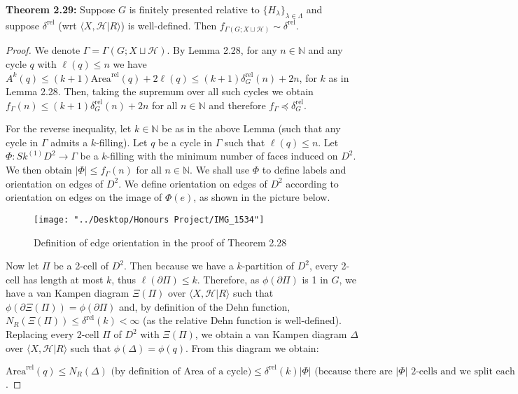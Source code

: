 \documentclass[12pt]{article}
\newcommand{\vs}{\vskip10pt}
\begin{document}
	\textbf{Theorem 2.29: } Suppose $G$ is finitely presented relative to $\{H_{\lambda}\}_{\lambda \in \Lambda}$ and suppose $\delta^{\text{rel}}$ (wrt $\langle X, \mathcal{H} \vert R \rangle$) is well-defined. Then $f_{\Gamma(G; X \sqcup \mathcal{H})} \sim \delta^{\text{rel}}$. 
	
	\begin{proof}
		
		We denote $\Gamma = \Gamma(G; X \sqcup \mathcal{H})$. By Lemma 2.28, for any $n \in \mathbb{N}$ and any cycle $q$ with $\ell(q) \leq n$ we have $A^{k}(q) \leq (k+1) \text{Area}^{\text{rel}}(q) + 2 \ell(q) \leq (k+1) \delta_G^{\text{rel}}(n) + 2n$, for $k$ as in Lemma 2.28. Then, taking the supremum over all such cycles we obtain $f_{\Gamma} (n) \leq (k+1) \delta_G^{\text{rel}}(n) + 2n$ for all $n \in \mathbb{N}$ and therefore $f_{\Gamma} \preccurlyeq \delta_G^{\text{rel}}$. 
		
		\vs 
		
		For the reverse inequality, let $k \in \mathbb{N}$ be as in the above Lemma (such that any cycle in $\Gamma$ admits a $k$-filling). Let $q$ be a cycle in $\Gamma$ such that $\ell(q) \leq n$. Let $\Phi: Sk^{(1)} D^2 \rightarrow \Gamma$ be a $k$-filling with the minimum number of faces induced on $D^2$. We then obtain $\vert \Phi \vert \leq f_{\Gamma}(n)$ for all $n \in \mathbb{N}$. We shall use $\Phi$ to define labels and orientation on edges of $D^2$. We define orientation on edges of $D^2$ according to orientation on edges on the image of $\Phi(e)$, as shown in the picture below. 
		
		\begin{figure} [H]
			\centering
			\texttt{[image: "../Desktop/Honours Project/IMG\_1534"]}
			\caption{Definition of edge orientation in the proof of Theorem 2.28}
			\label{fig:img1534}
		\end{figure}
		
		\vs 
		
		Now let $\Pi$ be a 2-cell of $D^2$. Then because we have a $k$-partition of $D^2$, every 2-cell has length at most $k$, thus $\ell(\partial \Pi) \leq k$. Therefore, as $\phi(\partial \Pi)$ is 1 in $G$, we have a van Kampen diagram $\Xi(\Pi)$ over $\langle X, \mathcal{H} \vert R \rangle$ such that $\phi(\partial \Xi(\Pi)) = \phi(\partial \Pi)$ and, by definition of the Dehn function, $N_{R} (\Xi(\Pi)) \leq \delta^{\text{rel}}(k) < \infty$ (as the relative Dehn function is well-defined). Replacing every 2-cell $\Pi$ of $D^2$ with $\Xi(\Pi)$, we obtain a van Kampen diagram $\Delta$ over $\langle X, \mathcal{H} \vert R \rangle$ such that $\phi(\Delta) = \phi(q)$. From this diagram we obtain: 
		
		\vs 
		
		$\text{Area}^{\text{rel}}(q) \leq N_R (\Delta) \text{ (by definition of Area of a cycle)} \leq \delta^{\text{rel}}(k) \vert \Phi \vert \text{ (because there are } \vert \Phi \vert \text{ 2-cells and we split each 2-cell into }  N_{R} (\Xi(\Pi)) \leq \delta^{\text{rel}}(k) \text{ smaller 2-cells)} \leq f_{\Gamma} (n) \delta^{\text{rel}}(k) \text{ (because  } \vert \Phi \vert \leq f_{\Gamma}(n) )$.
		
	\end{proof}
\end{document}
